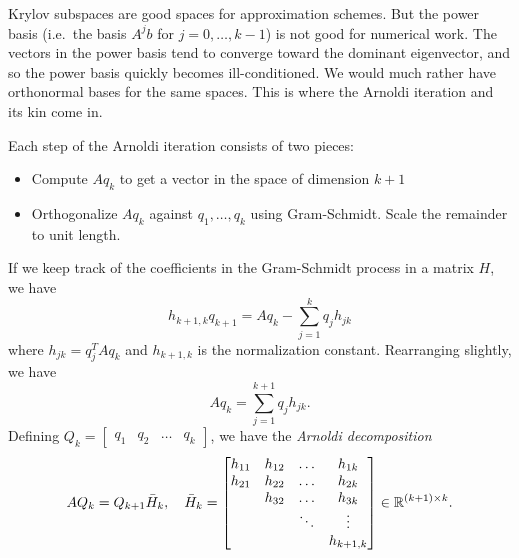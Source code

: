 \documentclass[12pt, leqno]{article} %
\begin{document}
Krylov subspaces are good spaces for approximation schemes.  But the
power basis (i.e.~the basis $A^j b$ for $j = 0, \ldots, k-1$) is not
good for numerical work.  The vectors in the power basis tend to
converge toward the dominant eigenvector, and so the power basis quickly
becomes ill-conditioned.  We would much rather have orthonormal bases
for the same spaces.  This is where the Arnoldi iteration and its kin
come in.

Each step of the Arnoldi iteration consists of two pieces:
\begin{itemize}
\item
  Compute $Aq_k$ to get a vector in the space of dimension $k+1$
\item
  Orthogonalize $Aq_k$ against $q_1, \ldots, q_k$ using Gram-Schmidt.
  Scale the remainder to unit length.
\end{itemize}
If we keep track of the coefficients in the Gram-Schmidt process
in a matrix $H$, we have
\[
  h_{k+1,k} q_{k+1} = Aq_k - \sum_{j=1}^{k} q_j h_{jk}
\]
where $h_{jk} = q_j^T A q_k$ and $h_{k+1,k}$ is the normalization
constant.  Rearranging slightly, we have
\[
  Aq_k = \sum_{j=1}^{k+1} q_j h_{jk}.
\]
Defining $Q_k = \begin{bmatrix} q_1 & q_2 & \ldots & q_k \end{bmatrix}$,
we have the {\em Arnoldi decomposition}
\[
  AQ_k = Q_{k+1} \bar{H}_k, \quad
  \bar{H}_k =
  \begin{bmatrix}
    h_{11} & h_{12} & \ldots & h_{1k} \\
    h_{21} & h_{22} & \ldots & h_{2k} \\
           & h_{32} & \ldots & h_{3k} \\
           &        & \ddots & \vdots \\
           &        &        & h_{k+1,k}
  \end{bmatrix} \in \mathbb{R}^{(k+1) \times k}.
\]
%

%
\end{document}
